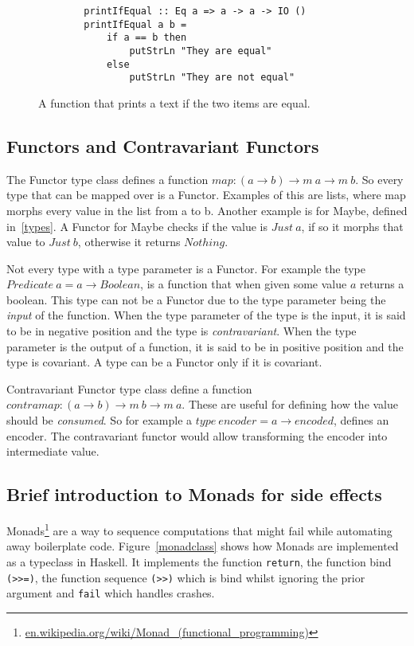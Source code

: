 \begin{figure}[H]
    \begin{lstlisting}
        printIfEqual :: Eq a => a -> a -> IO ()
        printIfEqual a b =
            if a == b then
                putStrLn "They are equal"
            else
                putStrLn "They are not equal"
    \end{lstlisting}
    \caption{A function that prints a text if the two items are equal.}
    \label{printifequal}
\end{figure}

\subsection{Functors and Contravariant Functors}

The Functor type class defines a function $map : (a\rightarrow b) \rightarrow m\
a \rightarrow m\ b$. So every type that can be mapped over is a Functor.
Examples of this are lists, where map morphs every value in the list from a to
b. Another example is for Maybe, defined in~\ref{types}. A Functor for Maybe
checks if the value is $Just\ a$, if so it morphs that value to $Just\ b$,
otherwise it returns $Nothing$. 

Not every type with a type parameter is a Functor. For example the type
$Predicate\ a = a \rightarrow Boolean$, is a function that when given some value
$a$ returns a boolean. This type can not be a Functor due to the type parameter
being the \textit{input} of the function. When the type parameter of the type is
the input, it is said to be in negative position and the type is
\textit{contravariant}.  When the type parameter is the output of a function, it
is said to be in positive position and the type is covariant. A type can be a
Functor only if it is covariant.

Contravariant Functor type class define a function $contramap : (a\rightarrow b)
\rightarrow m\ b \rightarrow m\ a$. These are useful for defining how the value
should be \textit{consumed}. So for example a $type\ encoder = a\rightarrow
encoded$, defines an encoder. The contravariant functor would allow transforming
the encoder into intermediate value.

\subsection{Brief introduction to Monads for side effects}\label{monads}

Monads\footnote{\url{en.wikipedia.org/wiki/Monad_(functional_programming)}} are
a way to sequence computations that might fail while automating away boilerplate
code. Figure~\ref{monadclass} shows how Monads are implemented as a typeclass in
Haskell. It implements the function \texttt{return}, the function bind
\texttt{(>>=)}, the function sequence \texttt{(>>)} which is bind whilst
ignoring the prior argument and \texttt{fail} which handles crashes.

